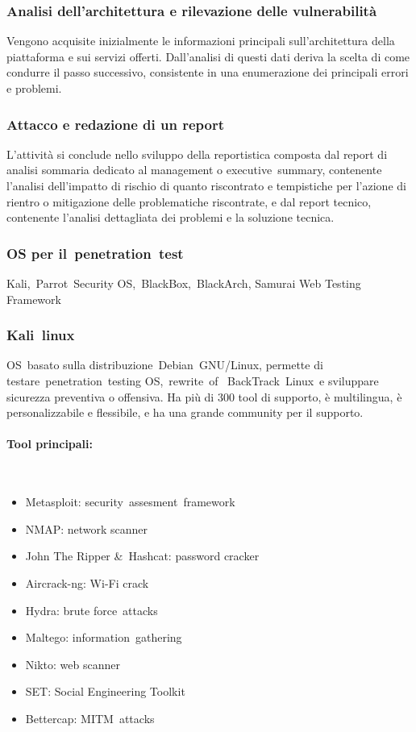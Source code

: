 \documentclass{article}
\begin{document}
\subsubsection{Analisi dell’architettura e rilevazione delle vulnerabilità}
Vengono acquisite inizialmente le informazioni principali sull'architettura della piattaforma e sui servizi 
offerti. Dall'analisi di questi dati deriva la scelta di come condurre il passo successivo, consistente in 
una enumerazione dei principali errori e problemi. 
\subsubsection{Attacco e redazione di un report}
L'attività si conclude nello sviluppo della reportistica composta dal report di analisi sommaria dedicato 
al management o executive summary, contenente l'analisi dell'impatto di rischio di quanto riscontrato e 
tempistiche per l'azione di rientro o mitigazione delle problematiche riscontrate, e dal report tecnico, 
contenente l'analisi dettagliata dei problemi e la soluzione tecnica. 
\subsubsection{OS per il penetration test}
Kali, Parrot Security OS, BlackBox, BlackArch, Samurai Web Testing Framework 
\subsubsection{Kali linux}
OS basato sulla distribuzione Debian GNU/Linux, permette di testare penetration testing OS, rewrite of 
BackTrack Linux e sviluppare sicurezza preventiva o offensiva. Ha più di 300 tool di supporto, è 
multilingua, è personalizzabile e flessibile, e ha una grande community per il supporto. \\
\pagebreak
\paragraph{Tool principali:} 
\begin{itemize}
    \item Metasploit: security assesment framework
    \item NMAP: network scanner 
    \item John The Ripper \& Hashcat: password cracker
    \item Aircrack-ng: Wi-Fi crack
    \item Hydra: brute force attacks
    \item Maltego: information gathering
    \item Nikto: web scanner
    \item SET: Social Engineering Toolkit
    \item Bettercap: MITM attacks 
\end{itemize}
\end{document}
